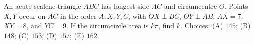 An acute scalene triangle $ABC$ has longest side $AC$ and circumcentre $O$. Points $X,Y$ occur on $AC$ in the order $A,X,Y,C$, with $OX\perp BC$, $OY\perp AB$, $AX=7$, $XY=8$, and $YC=9$. If the circumcircle area is $k\pi$, find $k$. Choices: (A) $145$; (B) $148$; (C) $153$; (D) $157$; (E) $162$.
